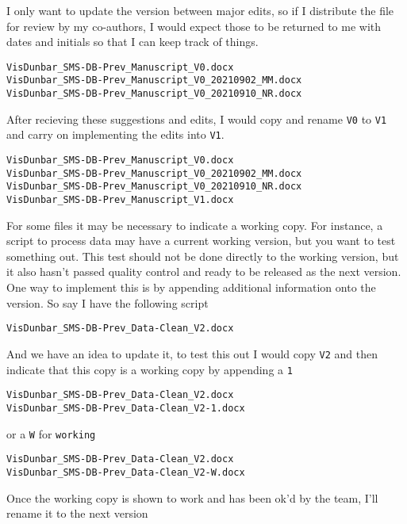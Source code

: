 \documentclass[
]{book}
\begin{document}
I only want to update the version between major edits, so if I distribute the file for review by my co-authors, I would expect those to be returned to me with dates and initials so that I can keep track of things.

\begin{verbatim}
VisDunbar_SMS-DB-Prev_Manuscript_V0.docx
VisDunbar_SMS-DB-Prev_Manuscript_V0_20210902_MM.docx
VisDunbar_SMS-DB-Prev_Manuscript_V0_20210910_NR.docx
\end{verbatim}

After recieving these suggestions and edits, I would copy and rename \texttt{V0} to \texttt{V1} and carry on implementing the edits into \texttt{V1}.

\begin{verbatim}
VisDunbar_SMS-DB-Prev_Manuscript_V0.docx
VisDunbar_SMS-DB-Prev_Manuscript_V0_20210902_MM.docx
VisDunbar_SMS-DB-Prev_Manuscript_V0_20210910_NR.docx
VisDunbar_SMS-DB-Prev_Manuscript_V1.docx
\end{verbatim}

For some files it may be necessary to indicate a working copy. For instance, a script to process data may have a current working version, but you want to test something out. This test should not be done directly to the working version, but it also hasn't passed quality control and ready to be released as the next version. One way to implement this is by appending additional information onto the version. So say I have the following script

\begin{verbatim}
VisDunbar_SMS-DB-Prev_Data-Clean_V2.docx
\end{verbatim}

And we have an idea to update it, to test this out I would copy \texttt{V2} and then indicate that this copy is a working copy by appending a \texttt{1}

\begin{verbatim}
VisDunbar_SMS-DB-Prev_Data-Clean_V2.docx
VisDunbar_SMS-DB-Prev_Data-Clean_V2-1.docx
\end{verbatim}

or a \texttt{W} for \texttt{working}

\begin{verbatim}
VisDunbar_SMS-DB-Prev_Data-Clean_V2.docx
VisDunbar_SMS-DB-Prev_Data-Clean_V2-W.docx
\end{verbatim}

Once the working copy is shown to work and has been ok'd by the team, I'll rename it to the next version
\end{document}
